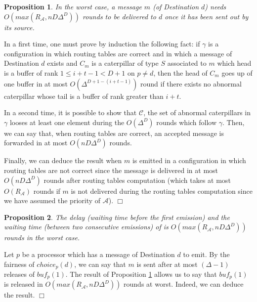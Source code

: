 \documentclass[11pt]{article}
\newtheorem{proposition}{Proposition}
\newenvironment{sketchproof}{{\noindent\bf Sketch of proof. } }{{\hfill $\Box$}}
\begin{document}
\begin{proposition} \label{prop:complexiteD}
In the worst case, a message $m$ (of Destination $d$) needs $O(max(R_{\mathcal{A}},nD\Delta^{D}))$ rounds to be delivered to $d$ once it has been sent out by its source.
\end{proposition}

\begin{sketchproof}
In a first time, one must prove by induction the following fact: if $\gamma$ is a configuration in which routing tables are correct and in which a message of Destination $d$ exists and $C_{m}$ is a caterpillar of type $S$ associated to $m$ which head is a buffer of rank $1\leq i+t-1<D+1$ on $p\neq d$, then the head of $C_{m}$ goes up of one buffer in at most $O(\Delta^{D+1-(i+t-1)})$ round if there exists no abnormal caterpillar whose tail is a buffer of rank greater than $i+t$.

In a second time, it is possible to show that $\mathcal{C}$, the set of abnormal caterpillars in $\gamma$ looses at least one element during the $O(\Delta^{D})$ rounds which follow $\gamma$. Then, we can say that, when routing tables are correct, an accepted message is forwarded in at most $O(nD\Delta^{D})$ rounds.

Finally, we can deduce the result when $m$ is emitted in a configuration in which routing tables are not correct since the message is delivered in at most $O(nD\Delta^{D})$ rounds after routing tables computation (which takes at most $O(R_{\mathcal{A}})$ rounds if $m$ is not delivered during the routing tables computation since we have assumed the priority of $\mathcal{A}$).
\end{sketchproof}

\begin{proposition} \label{prop:delaiD}
The delay (waiting time before the first emission) and the waiting time (between two consecutive emissions) of \AD is $O(max(R_{\mathcal{A}},nD\Delta^{D}))$ rounds in the worst case.
\end{proposition}

\begin{sketchproof}
Let $p$ be a processor which has a message of Destination $d$ to emit. By the fairness of $choice_{p}(d)$, we can say that $m$ is sent after at most $(\Delta-1)$ releases of $buf_{p}(1)$. The result of Proposition \ref{prop:complexiteD} allows us to say that $buf_{p}(1)$ is released in $O(max(R_{\mathcal{A}},nD\Delta^{D}))$ rounds at worst. Indeed, we can deduce the result.
\end{sketchproof}
\end{document}
